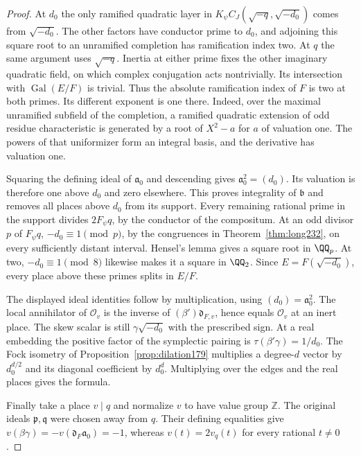 \documentclass[a4paper,11pt]{article}
\theoremstyle{definition}
\theoremstyle{remark}
\newcommand{\ZZ}{\mathbb Z}\newcommand{\ord}{\operatorname{ord}}
\numberwithin{equation}{section}
\newcommand{\OO}{\mathcal O}
\begin{document}
\begin{proof}
At \(d_0\) the only ramified quadratic layer in
\(K_\psi C_J(\sqrt{-q},\sqrt{-d_0})\) comes from \(\sqrt{-d_0}\).
The other factors have conductor prime to \(d_0\), and adjoining this
square root to an unramified completion has ramification index two.
At \(q\) the same argument uses \(\sqrt{-q}\). Inertia at either
prime fixes the other imaginary quadratic field, on which complex
conjugation acts nontrivially. Its intersection with
\(\operatorname{Gal}(E/F)\) is trivial. Thus the absolute
ramification index of \(F\) is two at both primes. Its different
exponent is one there. Indeed, over the maximal unramified subfield
of the completion, a ramified quadratic extension of odd residue
characteristic is generated by a root of \(X^2-a\) for \(a\) of
valuation one. The powers of that uniformizer form an integral basis,
and the derivative has valuation one.

Squaring the defining ideal of \(\mathfrak a_0\) and descending gives
\(\mathfrak a_0^2=(d_0)\). Its valuation is therefore one above
\(d_0\) and zero elsewhere. This proves integrality of \(\mathfrak b\)
and removes all places above \(d_0\) from its support. Every remaining
rational prime in the support divides \(2F_\psi q\), by the conductor
of the compositum. At an odd divisor \(p\) of \(F_\psi q\),
\(-d_0\equiv1\pmod p\), by the congruences in Theorem~\ref{thm:long232},
on every sufficiently distant interval. Hensel's lemma gives a square
root in \(\QQ_p\). At two, \(-d_0\equiv1\pmod8\) likewise makes it a
square in \(\QQ_2\). Since \(E=F(\sqrt{-d_0})\), every place above
these primes splits in \(E/F\).

The displayed ideal identities follow by multiplication, using
\((d_0)=\mathfrak a_0^2\). The local annihilator of \(\OO_v\) is the
inverse of \((\beta')\mathfrak d_{F,v}\), hence equals \(\OO_v\) at
an inert place. The skew scalar is still \(\gamma\sqrt{-d_0}\) with
the prescribed sign. At a real embedding the positive factor of the
symplectic pairing is \(\tau(\beta'\gamma)=1/d_0\). The Fock isometry
of Proposition~\ref{prop:dilation179} multiplies a degree-\(d\) vector
by \(d_0^{d/2}\) and its diagonal coefficient by \(d_0^d\). Multiplying
over the edges and the real places gives the formula.

Finally take a place \(v\mid q\) and normalize \(v\) to have value
group \(\ZZ\). The original ideals \(\mathfrak p,\mathfrak q\) were
chosen away from \(q\). Their defining equalities give
\(v(\beta\gamma)=-v(\mathfrak d_F\mathfrak a_0)=-1\), whereas
\(v(t)=2v_q(t)\) for every rational \(t\ne0\).
\end{proof}
\end{document}
